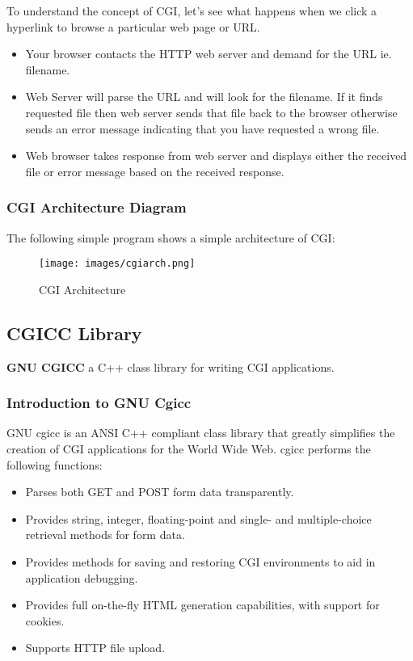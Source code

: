 To understand the concept of CGI, let's see what happens when we click
a hyperlink to browse a particular web page or URL.

\begin{itemize}
\item Your browser contacts the HTTP web server and demand for the URL
ie. filename.
\item Web Server will parse the URL and will look for the filename. If
it finds requested file then web server sends that file back to the
browser otherwise sends an error message indicating that you have
requested a wrong file.
\item Web browser takes response from web server and displays either
the received file or error message based on the received response.
\end{itemize}

\subsubsection{CGI Architecture Diagram}

The following simple program shows a simple architecture of CGI:

	\begin{figure}[h!]
	\centering
	\texttt{[image: images/cgiarch.png]}
	\caption{CGI Architecture}
	\end{figure}

\newpage

\subsection{CGICC Library}

{\bf GNU CGICC } a C++ class library for writing CGI applications.

\subsubsection{Introduction to GNU Cgicc}

GNU cgicc is an ANSI C++ compliant class library that greatly
simplifies the creation of CGI applications for the World Wide Web.
cgicc performs the following functions:

\begin{itemize}

\item Parses both GET and POST form data transparently. 
\item Provides string, integer, floating-point and single- and
multiple-choice retrieval methods for form data. 
\item Provides methods for saving and restoring CGI environments to
aid in application debugging. 
\item Provides full on-the-fly HTML generation capabilities, with
support for cookies. 
\item Supports HTTP file upload. 

\end{itemize}


